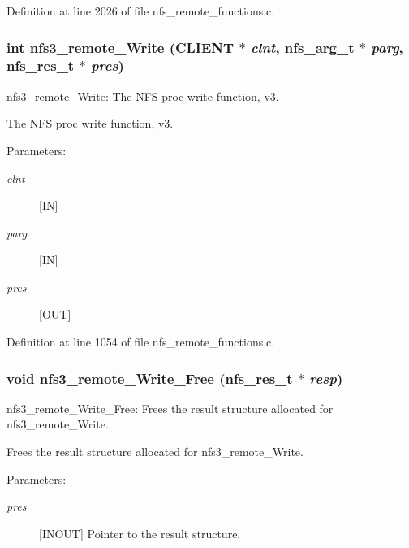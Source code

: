Definition at line 2026 of file nfs\_\-remote\_\-functions.c.
\subsubsection[{nfs3\_\-remote\_\-Write}]{\setlength{\rightskip}{0pt plus 5cm}int nfs3\_\-remote\_\-Write (CLIENT $\ast$ {\em clnt}, \/  nfs\_\-arg\_\-t $\ast$ {\em parg}, \/  nfs\_\-res\_\-t $\ast$ {\em pres})}\label{group__NFSprocs_gd46e3eae09a4f696a6b27defd87ed22f}


nfs3\_\-remote\_\-Write: The NFS proc write function, v3.

The NFS proc write function, v3.

\begin{Desc}
\item[Parameters:]
\begin{description}
\item[{\em clnt}][IN] \item[{\em parg}][IN] \item[{\em pres}][OUT] \end{description}
\end{Desc}


Definition at line 1054 of file nfs\_\-remote\_\-functions.c.
\subsubsection[{nfs3\_\-remote\_\-Write\_\-Free}]{\setlength{\rightskip}{0pt plus 5cm}void nfs3\_\-remote\_\-Write\_\-Free (nfs\_\-res\_\-t $\ast$ {\em resp})}\label{group__NFSprocs_gfea098a72d21596dae1cf828fae1962f}


nfs3\_\-remote\_\-Write\_\-Free: Frees the result structure allocated for nfs3\_\-remote\_\-Write.

Frees the result structure allocated for nfs3\_\-remote\_\-Write.

\begin{Desc}
\item[Parameters:]
\begin{description}
\item[{\em pres}][INOUT] Pointer to the result structure. \end{description}
\end{Desc}


